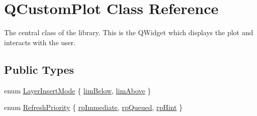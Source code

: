 \hypertarget{classQCustomPlot}{\section{\-Q\-Custom\-Plot \-Class \-Reference}
\label{classQCustomPlot}
}


\-The central class of the library. \-This is the \-Q\-Widget which displays the plot and interacts with the user.  


\subsection*{\-Public \-Types}
\begin{DoxyCompactItemize}
\item 
enum \hyperlink{classQCustomPlot_a75a8afbe6ef333b1f3d47abb25b9add7}{\-Layer\-Insert\-Mode} \{ \hyperlink{classQCustomPlot_a75a8afbe6ef333b1f3d47abb25b9add7aee39cf650cd24e68552da0b697ce4a93}{lim\-Below}, 
\hyperlink{classQCustomPlot_a75a8afbe6ef333b1f3d47abb25b9add7a062b0b7825650b432a713c0df6742d41}{lim\-Above}
 \}
\item 
enum \hyperlink{classQCustomPlot_a45d61392d13042e712a956d27762aa39}{\-Refresh\-Priority} \{ \hyperlink{classQCustomPlot_a45d61392d13042e712a956d27762aa39a0d4831572370d871f2b7cb88806bac59}{rp\-Immediate}, 
\hyperlink{classQCustomPlot_a45d61392d13042e712a956d27762aa39aaaae083a19bc668597bf0f86e000f798}{rp\-Queued}, 
\hyperlink{classQCustomPlot_a45d61392d13042e712a956d27762aa39adfa1f2387617168d9299f4c8ad15b332}{rp\-Hint}
 \}
\end{DoxyCompactItemize}
